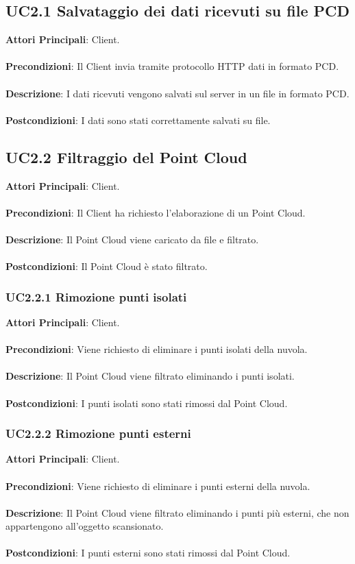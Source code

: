 \subsection{UC2.1 Salvataggio dei dati ricevuti su file PCD}
\textbf{Attori Principali}: Client.
\\\\ \textbf{Precondizioni}: Il Client invia tramite protocollo HTTP dati in formato PCD.
\\\\ \textbf{Descrizione}: I dati ricevuti vengono salvati sul server in un file in formato PCD.
\\\\ \textbf{Postcondizioni}: I dati sono stati correttamente salvati su file.

\subsection{UC2.2 Filtraggio del Point Cloud}
\textbf{Attori Principali}: Client.
\\\\ \textbf{Precondizioni}: Il Client ha richiesto l'elaborazione di un Point Cloud.
\\\\ \textbf{Descrizione}: Il Point Cloud viene caricato da file e filtrato.
\\\\ \textbf{Postcondizioni}: Il Point Cloud è stato filtrato.

\subsubsection{UC2.2.1 Rimozione punti isolati}
\textbf{Attori Principali}: Client.
\\\\ \textbf{Precondizioni}: Viene richiesto di eliminare i punti isolati della nuvola.
\\\\ \textbf{Descrizione}: Il Point Cloud viene filtrato eliminando i punti isolati.
\\\\ \textbf{Postcondizioni}: I punti isolati sono stati rimossi dal Point Cloud.

\subsubsection{UC2.2.2 Rimozione punti esterni}
\textbf{Attori Principali}: Client.
\\\\ \textbf{Precondizioni}: Viene richiesto di eliminare i punti esterni della nuvola.
\\\\ \textbf{Descrizione}: Il Point Cloud viene filtrato eliminando i punti più esterni, che non appartengono all'oggetto scansionato.
\\\\ \textbf{Postcondizioni}: I punti esterni sono stati rimossi dal Point Cloud.


